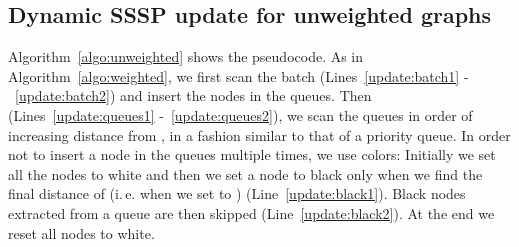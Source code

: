 \documentclass[english]{llncs}
\newcommand{\ie}{i.\,e.\xspace}
\begin{document}
\subsection{Dynamic SSSP update for unweighted graphs}
Algorithm~\ref{algo:unweighted} shows the pseudocode. As in Algorithm~\ref{algo:weighted}, we
first scan the batch (Lines~\ref{update:batch1} -~\ref{update:batch2}) and insert the nodes
in the queues. Then (Lines~\ref{update:queues1} -~\ref{update:queues2}), we scan the queues in order of increasing distance from , in a fashion similar to that of a priority queue. 
In order not to insert a node in the queues multiple times, we use colors: Initially we set all the nodes to white and then we set a node  to black only when we find the final distance of  (\ie when we set  to ) (Line~\ref{update:black1}). Black nodes extracted from a queue are then skipped (Line~\ref{update:black2}). At the end we reset all nodes to white.
\end{document}
